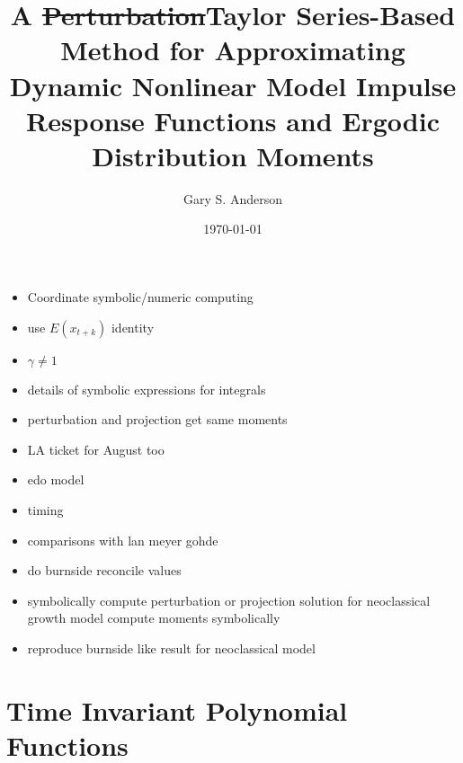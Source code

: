 \documentclass{beamer}
\begin{document}
\title[Taylor Series-Based Ergodic Distribution Moments]{A \st{Perturbation}Taylor Series-{Based} Method for Approximating Dynamic Nonlinear Model Impulse Response Functions and Ergodic Distribution Moments }
\author{Gary S. Anderson}
\date{\today} 

\frame{\titlepage} 

%
%
%	
%
%
\begin{itemize}
\item Coordinate symbolic/numeric computing
\item use $E(x_{t+k})$ identity
\item $\gamma \ne 1$
\item details of symbolic expressions for integrals
\item perturbation and projection get same moments
\item LA ticket for August too
\item edo model
\item timing
\item comparisons with lan meyer gohde
\item do burnside reconcile values
\item symbolically compute perturbation or projection solution for neoclassical growth model  compute moments symbolically
\item reproduce burnside like result for neoclassical model
\end{itemize}


\section{Time Invariant Polynomial Functions} 


\end{document}
